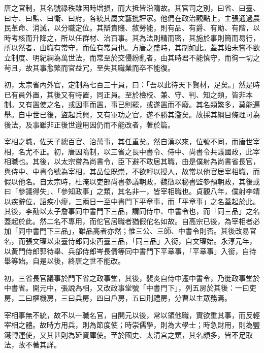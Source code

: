 
\begin{pinyinscope}

 唐之官制，其名號祿秩雖因時增損，而大抵皆沿隋故。其官司之別，曰省、曰臺、曰寺、曰監、曰衛、曰府，各統其屬文藝批評家。他們在政治觀點上，主張通過農民革命、消滅，以分職定位。其辯貴賤、敘勞能，則有品、有爵、有勛、有階，以時考核而升降之，所以任群材、治百事。其為法則精而密，其施於事則簡而易行，所以然者，由職有常守，而位有常員也。方唐之盛時，其制如此。蓋其始未嘗不欲立制度、明紀綱為萬世法，而常至於交侵紛亂者，由其時君不能慎守，而徇一切之茍且，故其事愈繁而官益冗，至失其職業而卒不能復。



 初，太宗省內外官，定制為七百三十員，曰：「吾以此待天下賢材，足矣。」然是時已有員外置，其後又有特置，同正員。至於檢校、兼、守、判、知之類，皆非本制。又有置使之名，或因事而置，事已則罷，或遂置而不廢。其名類繁多，莫能遍舉。自中世已後，盜起兵興，又有軍功之官，遂不勝其濫矣。故採其綱目條理可為後法，及事雖非正後世遵用因仍而不能改者，著於篇。



 宰相之職，佐天子總百官、治萬事，其任重矣。然自漢以來，位號不同，而唐世宰相，名尤不正。初，唐因隋制，以三省之長中書令、侍中、尚書令共議國政，此宰相職也。其後，以太宗嘗為尚書令，臣下避不敢居其職，由是僕射為尚書省長官，與侍中、中書令號為宰相，其品位既崇，不欲輕以授人，故常以他官居宰相職，而假以他名。自太宗時，杜淹以吏部尚書參議朝政，魏徵以秘書監參預朝政，其後或曰「參議得失」、「參知政事」之類，其名非一，皆宰相職也。貞觀八年，僕射李靖以疾辭位，詔疾小瘳，三兩日一至中書門下平章事，而「平章事」之名蓋起於此。其後，李勣以太子詹事同中書門下三品，謂同侍中、中書令也，而「同三品」之名蓋起於此。然二名不專用，而佗官居職者猶假佗名如故。自高宗已後，為宰相者必加「同中書門下三品」，雖品高者亦然；惟三公、三師、中書令則否。其後改易官名，而張文瓘以東臺侍郎同東西臺三品，「同三品」入銜，自文瓘始。永淳元年，以黃門侍郎郭待舉、兵部侍郎岑長倩等同中書門下平章事，「平章事」入銜，自待舉等始。自是以後，終唐之世不能改。



 初，三省長官議事於門下省之政事堂，其後，裴炎自侍中遷中書令，乃徙政事堂於中書省。開元中，張說為相，又改政事堂號「中書門下」，列五房於其後：一曰吏房，二曰樞機房，三曰兵房，四曰戶房，五曰刑禮房，分曹以主眾務焉。



 宰相事無不統，故不以一職名官，自開元以後，常以領他職，實欲重其事，而反輕宰相之體。故時方用兵，則為節度使；時崇儒學，則為大學士；時急財用，則為鹽鐵轉運使，又其甚則為延資庫使。至於國史、太清宮之類，其名頗多，皆不足取法，故不著其詳。




\end{pinyinscope}

